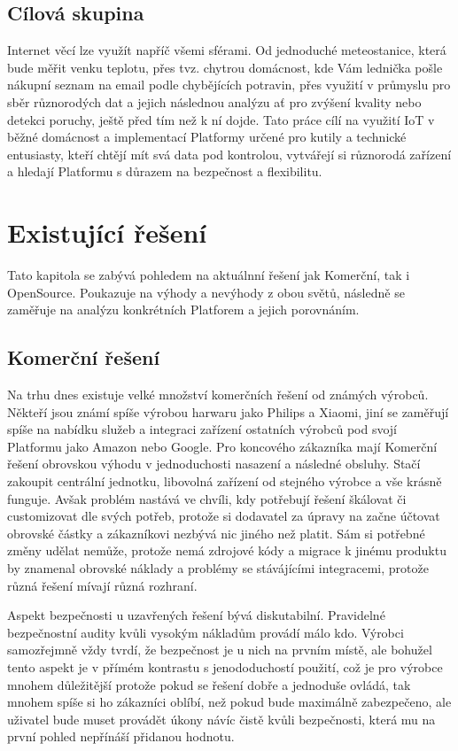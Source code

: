 \subsection{Cílová skupina}
Internet věcí lze využít napříč všemi sférami. Od jednoduché meteostanice, která bude měřit venku teplotu, přes tvz. chytrou domácnost, kde Vám lednička pošle nákupní seznam na email podle chybějících potravin, přes využití v průmyslu pro sběr různorodých dat a jejich následnou analýzu ať pro zvýšení kvality nebo detekci poruchy, ještě před tím než k ní dojde. Tato práce cílí na využití IoT v běžné domácnost a implementací Platformy určené pro kutily a technické entusiasty, kteří chtějí mít svá data pod kontrolou, vytvářejí si různorodá zařízení a hledají Platformu s důrazem na bezpečnost a flexibilitu.


\section{Existující řešení}
Tato kapitola se zabývá pohledem na aktuálnní řešení jak Komerční, tak i OpenSource. Poukazuje na výhody a nevýhody z obou světů, následně se zaměřuje na analýzu konkrétních Platforem a jejich porovnáním.
\subsection{Komerční řešení} %
Na trhu dnes existuje velké množství komerčních řešení od známých výrobců. Někteří jsou známí spíše výrobou harwaru jako Philips a Xiaomi, jiní se zaměřují spíše na nabídku služeb a integraci zařízení ostatních výrobců pod svojí Platformu jako Amazon nebo Google. Pro koncového zákazníka mají Komerční řešení obrovskou výhodu v jednoduchosti nasazení a následné obsluhy. Stačí zakoupit centrální jednotku, libovolná zařízení od stejného výrobce a vše krásně funguje. Avšak problém nastává ve chvíli, kdy potřebují řešení škálovat či customizovat dle svých potřeb, protože si dodavatel za úpravy na  začne účtovat obrovské částky a zákazníkovi nezbývá nic jiného než platit. Sám si potřebné změny udělat nemůže, protože nemá zdrojové kódy a migrace k jinému produktu by znamenal obrovské náklady a problémy se stávájícími integracemi, protože různá řešení mívají různá rozhraní.

Aspekt bezpečnosti u uzavřených řešení bývá diskutabilní. Pravidelné bezpečnostní audity kvůli vysokým nákladům provádí málo kdo. Výrobci samozřejmně vždy tvrdí, že bezpečnost je u nich na prvním místě, ale bohužel tento aspekt je v přímém kontrastu s jenododuchostí použití, což je pro výrobce mnohem důležitější protože pokud se řešení dobře a jednoduše ovládá, tak mnohem spíše si ho zákazníci oblíbí, než pokud bude maximálně zabezpečeno, ale uživatel bude muset provádět úkony návíc čistě kvůli bezpečnosti, která mu na první pohled nepřínáší přidanou hodnotu.


